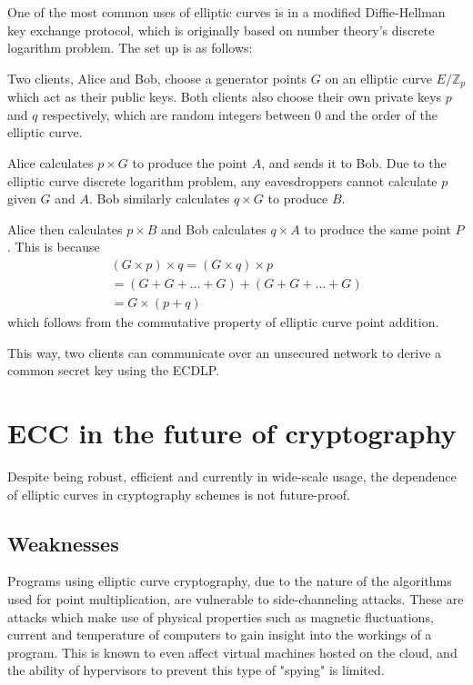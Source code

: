 \documentclass[a4paper]{article}
\begin{document}
One of the most common uses of elliptic curves is in a modified Diffie-Hellman key exchange protocol, which is originally based on number theory's discrete logarithm problem. The set up is as follows:

Two clients, Alice and Bob, choose a generator points $G$ on an elliptic curve $E/\mathbb{Z}_p$ which act as their public keys. Both clients also choose their own private keys $p$ and $q$ respectively, which are random integers between $0$ and the order of the elliptic curve.

Alice calculates $p \times G$ to produce the point $A$, and sends it to Bob. Due to the elliptic curve discrete logarithm problem, any eavesdroppers cannot calculate  $p$ given $G$ and $A$. Bob similarly calculates $q \times G$ to produce $B$.

Alice then calculates $p \times B$ and Bob calculates $q \times A$ to produce the same point $P$. This is because 
\begin{align*}
    (G \times p) \times q = (G \times q) \times p \\
    = (G + G + \dots + G) + (G + G + \dots + G) \\
    = G \times (p + q)
\end{align*}
which follows from the commutative property of elliptic curve point addition.

This way, two clients can communicate over an unsecured network to derive a common secret key using the ECDLP.\cite{practical}


\section{ECC in the future of cryptography}

Despite being robust, efficient and currently in wide-scale usage, the dependence of elliptic curves in cryptography schemes is not future-proof.

\subsection{Weaknesses}\label{weak}
Programs using elliptic curve cryptography, due to the nature of the algorithms used for point multiplication, are vulnerable to side-channeling attacks.\cite{nist} These are attacks which make use of physical properties such as magnetic fluctuations, current and temperature of computers to gain insight into the workings of a program. This is known to even affect virtual machines hosted on the cloud, and the ability of hypervisors to prevent this type of "spying" is limited.\cite{cloud}
\end{document}
